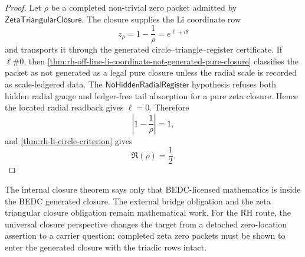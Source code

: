 \begin{proof}
Let $\rho$ be a completed non-trivial zero packet admitted by
$\mathsf{ZetaTriangularClosure}$. The closure supplies the Li coordinate
row
$$
z_{\rho}=1-\frac1{\rho}=e^{\ell+i\theta}
$$
and transports it through the generated circle--triangle--register
certificate. If $\ell\#0$, then
\autoref{thm:rh-off-line-li-coordinate-not-generated-pure-closure}
classifies the packet as not generated as a legal pure closure unless
the radial scale is recorded as scale-ledgered data. The
$\mathsf{NoHiddenRadialRegister}$ hypothesis refuses both hidden radial
gauge and ledger-free tail absorption for a pure zeta closure. Hence the
located radial readback gives $\ell=0$. Therefore
$$
\left|1-\frac1{\rho}\right|=1,
$$
and \autoref{thm:rh-li-circle-criterion} gives
$$
\Re(\rho)=\frac12.
$$
\end{proof}

\begin{principle}
\label{prin:unified-reality-universal-generation-closure-status}
The internal closure theorem says only that BEDC-licensed mathematics is
inside the BEDC generated closure. The external bridge obligation and
the zeta triangular closure obligation remain mathematical work. For
the RH route, the universal closure perspective changes the target from
a detached zero-location assertion to a carrier question: completed zeta
zero packets must be shown to enter the generated closure with the
triadic rows intact.
\end{principle}
